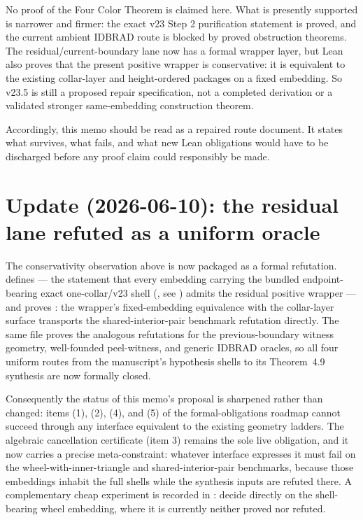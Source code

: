 \documentclass[11pt]{article}
\begin{document}
No proof of the Four Color Theorem is claimed here.  What is presently supported
is narrower and firmer: the exact v23 Step 2 purification statement is proved,
and the current ambient IDBRAD route is blocked by proved obstruction theorems.
The residual/current-boundary lane now has a formal wrapper layer, but Lean
also proves that the present positive wrapper is conservative: it is equivalent
to the existing collar-layer and height-ordered packages on a fixed embedding.
So v23.5 is still a proposed repair specification, not a completed derivation
or a validated stronger same-embedding construction theorem.

Accordingly, this memo should be read as a repaired route document.  It states
what survives, what fails, and what new Lean obligations would have to be
discharged before any proof claim could responsibly be made.

\section{Update (2026-06-10): the residual lane refuted as a uniform oracle}

The conservativity observation above is now packaged as a formal refutation.
 defines
 --- the statement that every embedding
carrying the bundled endpoint-bearing exact one-collar/v23 shell
(, see ) admits the residual
positive wrapper --- and proves :
the wrapper's fixed-embedding equivalence with the collar-layer surface
transports the shared-interior-pair benchmark refutation directly.  The same
file proves the analogous refutations for the previous-boundary witness
geometry, well-founded peel-witness, and generic IDBRAD oracles, so all four
uniform routes from the manuscript's hypothesis shells to its Theorem~4.9
synthesis are now formally closed.

Consequently the status of this memo's proposal is sharpened rather than
changed: items (1), (2), (4), and (5) of the formal-obligations roadmap cannot
succeed through any interface equivalent to the existing geometry ladders.
The algebraic cancellation certificate (item 3) remains the sole live
obligation, and it now carries a precise meta-constraint: whatever interface
expresses it must fail on the wheel-with-inner-triangle and
shared-interior-pair benchmarks, because those embeddings inhabit the full
shells while the synthesis inputs are refuted there.  A complementary cheap
experiment is recorded in : decide
 directly on the shell-bearing wheel
embedding, where it is currently neither proved nor refuted.
\end{document}
